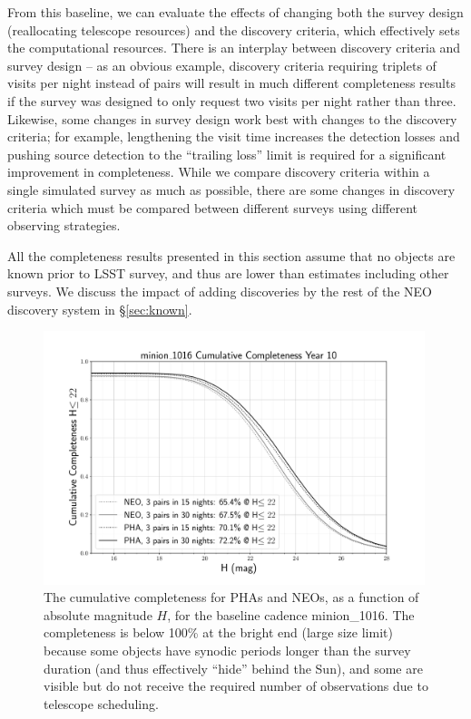 From this baseline, we can evaluate the effects of changing both the survey design (reallocating telescope resources) and the discovery criteria, which effectively sets the computational resources.
There is an interplay between discovery criteria and survey design -- as an obvious example, discovery criteria requiring triplets of visits per night instead of pairs will result in much different completeness results if the survey was designed to only request two visits per night rather than three. Likewise, some changes in survey design work best with changes to the discovery criteria; for example, lengthening the visit time increases the detection losses and pushing source detection to the ``trailing loss'' limit is required for a significant improvement in completeness. While we compare discovery criteria within a single simulated survey as much as possible, there are some changes in discovery criteria which must be compared between different surveys using different observing strategies.

All the completeness results presented in this section assume that no objects are known prior to LSST survey,
and thus are lower than estimates including other surveys. We discuss the impact of adding discoveries by the 
rest of the NEO discovery system in \S\ref{sec:known}. 

\begin{figure}[t!]
\centering
\includegraphics[width=0.99\textwidth]{figures/minion_1016_CumulativeCompleteness_NEO_and_PHA_Cumulative_Completeness}
\vskip -0.2in
\caption{The cumulative completeness for PHAs and NEOs, as a function of absolute magnitude $H$, for the baseline
cadence minion\_1016. The completeness is below 100\% at the bright end (large size limit) because some objects have
synodic periods longer than the survey duration (and thus effectively ``hide'' behind the Sun), and some are visible but
 do not receive the required number of observations due to telescope scheduling. \label{fig:minionC1}}
\end{figure}


